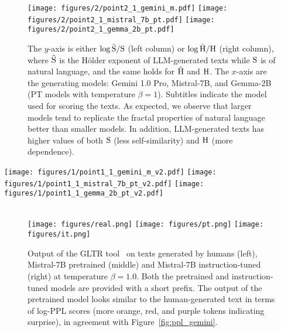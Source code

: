 \begin{figure}[t]
    \centering
    \texttt{[image: figures/2/point2\_1\_gemini\_m.pdf]}
    \texttt{[image: figures/2/point2\_1\_mistral\_7b\_pt.pdf]}
    \texttt{[image: figures/2/point2\_1\_gemma\_2b\_pt.pdf]}
    \caption{The $y$-axis is either $\log\tilde{\mathrm{S}}/\mathrm{S}$ (left column) or $\log\tilde{\mathrm{H}}/\mathrm{H}$ (right column), where $\tilde {\mathrm{S}}$ is the H\"older exponent of LLM-generated texts while $\mathrm{S}$ is of natural language, and the same holds for $\tilde{\mathrm{H}}$ and  $\mathrm{H}$. The $x$-axis are the generating models: Gemini 1.0 Pro, Mistral-7B, and Gemma-2B (PT models with temperature $\beta=1$).  Subtitles indicate the model used for scoring the texts. As expected, we observe that larger models tend to replicate the fractal properties of natural language better than smaller models. In addition, LLM-generated texts has higher values of both $\mathrm{S}$ (less self-similarity) and $\mathrm{H}$ (more dependence).}
    \label{fig:fractal_param_pt}
\end{figure}
\begin{figure*}[t]
    \centering
    \texttt{[image: figures/1/point1\_1\_gemini\_m\_v2.pdf]}
    \texttt{[image: figures/1/point1\_1\_mistral\_7b\_pt\_v2.pdf]}
    \texttt{[image: figures/1/point1\_1\_gemma\_2b\_pt\_v2.pdf]}
    \caption{$y$-axis is the log-ratio of log-PPL scores for both pretrained and instruction-tuned models, when Gemini 1.0 Pro (top), Mistral-7B (middle), and Gemma-2B (bottom) is used to score texts. Texts generated by large pretrained models do \emph{not} have a lower log-PPL than natural texts; instruction tuning and the use of small temperatures lead to that effect.}
    \label{fig:ppl_gemini}
\end{figure*}
\begin{figure}[t]
     \\
    \texttt{[image: figures/real.png]}
    \texttt{[image: figures/pt.png]}
    \texttt{[image: figures/it.png]}
    \caption{Output of the GLTR tool~\citep{gehrmann-etal-2019-gltr} on texts generated by humans (left), Mistral-7B pretrained (middle) and Mistral-7B instruction-tuned (right) at temperature $\beta=1.0$. Both the pretrained and instruction-tuned models are provided with a short prefix. The output of the pretrained model looks similar to the human-generated text in terms of log-PPL scores (more orange, red, and purple tokens indicating surprise), in agreement with Figure~\ref{fig:ppl_gemini}.}
    \label{fig:gltr}
\end{figure}

